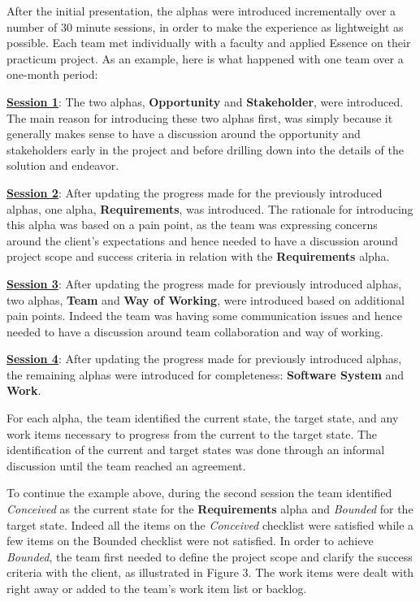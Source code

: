 After the initial presentation, the alphas were introduced incrementally over a number of 30 minute sessions, in order to make the experience as lightweight as possible. Each team met individually with a faculty and applied Essence on their practicum project. As an example, here is what happened with one team over a one-month period:

\underline{\textbf{Session 1}}: The two  alphas, \textbf{Opportunity} and \textbf{Stakeholder}, were introduced. The main reason for introducing these two alphas first, was simply because it generally makes sense to have a discussion around the opportunity and stakeholders early in the project and before drilling down into the details of the solution and endeavor.

\underline{\textbf{Session 2}}: After updating the progress made for the previously introduced alphas, one  alpha, \textbf{Requirements}, was introduced. The rationale for introducing this alpha was based on a pain point, as the team was expressing concerns around the client's expectations and hence needed to have a discussion around project scope and success criteria in relation with the \textbf{Requirements} alpha.

\underline{\textbf{Session 3}}: After updating the progress made for previously introduced alphas, two  alphas, \textbf{Team} and \textbf{Way of Working}, were introduced based on additional pain points. Indeed the team was having some communication issues and hence needed to have a discussion around team collaboration and way of working.

\underline{\textbf{Session 4}}: After updating the progress made for previously introduced alphas, the remaining alphas were introduced for completeness: \textbf{Software System} and \textbf{Work}.

For each alpha, the team identified the current state, the target state, and any work items necessary to progress from the current to the target state. The identification of the current and target states was done through an informal discussion until the team reached an agreement.

To continue the example above, during the second session the team identified \textit{Conceived} as the current state for the \textbf{Requirements} alpha and \textit{Bounded} for the target state. Indeed all the items on the \textit{Conceived} checklist were satisfied while a few items on the Bounded checklist were not satisfied. In order to achieve \textit{Bounded}, the team first needed to define the project scope and clarify the success criteria with the client, as illustrated in Figure 3. The work items were dealt with right away or added to the team's work item list or backlog.

